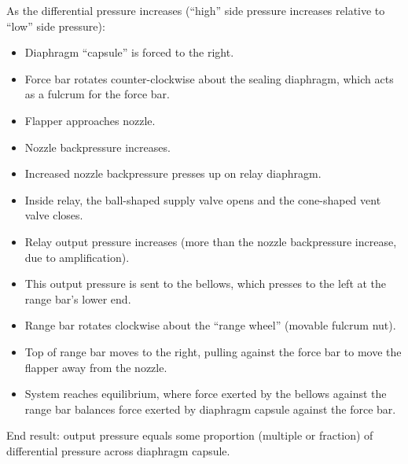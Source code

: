





As the differential pressure increases (``high'' side pressure increases relative to ``low'' side pressure):

\begin{itemize}
\item{} Diaphragm ``capsule'' is forced to the right.
\item{} Force bar rotates counter-clockwise about the sealing diaphragm, which acts as a fulcrum for the force bar.
\item{} Flapper approaches nozzle.
\item{} Nozzle backpressure increases.
\item{} Increased nozzle backpressure presses up on relay diaphragm.
\item{} Inside relay, the ball-shaped supply valve opens and the cone-shaped vent valve closes.
\item{} Relay output pressure increases (more than the nozzle backpressure increase, due to amplification).
\item{} This output pressure is sent to the bellows, which presses to the left at the range bar's lower end.
\item{} Range bar rotates clockwise about the ``range wheel'' (movable fulcrum nut).
\item{} Top of range bar moves to the right, pulling against the force bar to move the flapper away from the nozzle.
\item{} System reaches equilibrium, where force exerted by the bellows against the range bar balances force exerted by diaphragm capsule against the force bar.
\end{itemize}

End result: output pressure equals some proportion (multiple or fraction) of differential pressure across diaphragm capsule.











